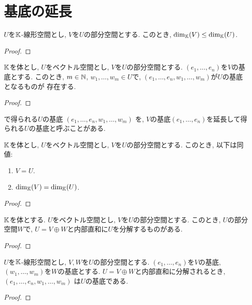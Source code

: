 \section{基底の延長}
\begin{prop}
  $U$を$\mathbb{K}$-線形空間とし,
  $V$を$U$の部分空間とする.
  このとき,  $\dim_{\mathbb{K}}(V) \leq \dim_{\mathbb{K}}(U)$.
\end{prop}
\begin{proof}\end{proof}


\begin{prop}
\label{prop:basis:ext}
  $\mathbb{K}$を体とし,
  $U$をベクトル空間とし,
  $V$を$U$の部分空間とする.
  $(e_1,\ldots,e_n)$を$V$の基底とする.
  このとき,
  $m\in \mathbb{N}$,
  $w_1,\ldots,w_m\in U$で,
  $(e_1,\ldots,e_n,w_1,\ldots,w_m)$が$U$の基底となるものが
  存在する.  
\end{prop}
\begin{proof}\end{proof}
\begin{remark}
で得られる$U$の基底
  $(e_1,\ldots,e_n,w_1,\ldots,w_m)$
  を,
  $V$の基底$(e_1,\ldots,e_n)$を延長して得られる$U$の基底と呼ぶことがある.
\end{remark}

\begin{cor}
$\mathbb{K}$を体とし,
  $U$をベクトル空間とし,
  $V$を$U$の部分空間とする.
  このとき, 以下は同値:
  \begin{enumerate}
   \item $V = U$.
   \item $\dim_{\mathbb{K}}(V) = \dim_{\mathbb{K}}(U)$.
  \end{enumerate}
\end{cor}
\begin{proof}\end{proof}

\begin{prop}
$\mathbb{K}$を体とする.
  $U$をベクトル空間とし, $V$を$U$の部分空間とする.
  このとき, $U$の部分空間$W$で,
  $U=V\oplus W$と内部直和に$U$を分解するものがある.
\end{prop}
\begin{proof}\end{proof}

\begin{prop}
  $U$を$\mathbb{K}$-線形空間とし,
  $V, W$を$U$の部分空間とする.
  $(e_1,\ldots,e_n)$を$V$の基底,
  $(w_1,\ldots,w_m)$を$W$の基底とする.
  $U=V\oplus W$と内部直和に分解されるとき,
  $(e_1,\ldots,e_n,w_1,\ldots,w_m)$
  は$U$の基底である.
\end{prop}
\begin{proof}\end{proof}

